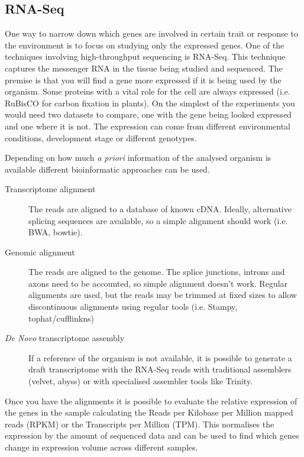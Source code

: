 \subsection{RNA-Seq}
\label{lit:RNASeq}

One way to narrow down which genes are involved in certain trait or response to the environment is to focus on studying only the expressed genes. One of the techniques involving high-throughput sequencing is RNA-Seq. This technique captures the messenger RNA in the tissue being studied and sequenced. The premise is that you will find a gene more expressed if it is being used by the organism. Some proteins with a vital role for the cell are always expressed (i.e. RuBisCO for carbon fixation in plants\cite{CooperGM2000}). On the simplest of the experiments you would need two datasets to compare, one with the gene being looked expressed and one where it is not. The expression can come from different environmental conditions, development stage or different genotypes.\cite{Mortazavi2008} 

Depending on how much \textit{a priori} information of the analysed organism is available different bioinformatic approaches can be used.
\begin{description}
\item[Transcriptome alignment] The reads are aligned to a database of known cDNA. Ideally, alternative splicing sequences are available, so a simple alignment should work (i.e. BWA, bowtie). 
\item[Genomic alignment] The reads are aligned to the genome. The splice junctions, introns and axons need to be accounted, so simple alignment doesn't work. Regular alignments are used, but the reads may be trimmed at fixed sizes to allow discontinuous alignments using regular tools (i.e. Stampy, tophat/cufflinkns)
\item[\textit{De Novo} transcriptome assembly] If a reference of the organism is not available, it is possible to generate a draft transcriptome with the RNA-Seq reads with traditional assemblers (velvet, abyss) or with specialised assembler tools like Trinity. 
\end{description}

Once you have the alignments it is possible to evaluate the relative expression of the genes in the sample calculating the Reads per Kilobase per Million mapped reads (RPKM) or the Transcripts per Million (TPM). This normalises the expression by the amount of sequenced data and can be used to find which genes change in expression volume across different samples.   

